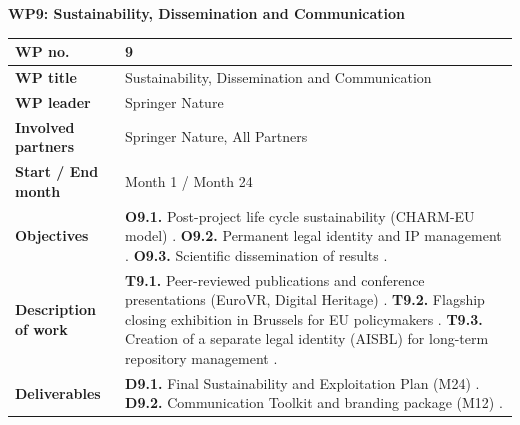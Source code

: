 \textbf{WP9: Sustainability, Dissemination and Communication}

\begin{table}[H]
\centering
\small
\renewcommand{\arraystretch}{1.2}
\begin{tabularx}{\textwidth}{|l|X|}
\hline
\rowcolor{gray!10} \textbf{WP no.} & 9 \\ \hline
\textbf{WP title} & Sustainability, Dissemination and Communication  \\ \hline
\textbf{WP leader} & Springer Nature  \\ \hline
\textbf{Involved partners} & Springer Nature, All Partners  \\ \hline
\textbf{Start / End month} & Month 1 / Month 24  \\ \hline
\textbf{Objectives} & \textbf{O9.1.} Post-project life cycle sustainability (CHARM-EU model) . \newline \textbf{O9.2.} Permanent legal identity and IP management . \newline \textbf{O9.3.} Scientific dissemination of results . \\ \hline
\textbf{Description of work} & \textbf{T9.1.} Peer-reviewed publications and conference presentations (EuroVR, Digital Heritage) . \newline \textbf{T9.2.} Flagship closing exhibition in Brussels for EU policymakers . \newline \textbf{T9.3.} Creation of a separate legal identity (AISBL) for long-term repository management . \\ \hline
\textbf{Deliverables} & \textbf{D9.1.} Final Sustainability and Exploitation Plan (M24) . \newline \textbf{D9.2.} Communication Toolkit and branding package (M12) . \\ \hline
\end{tabularx}
\end{table}